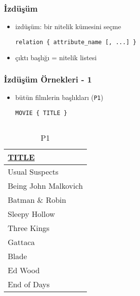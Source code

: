 \documentclass[dvipsnames]{beamer}
\theoremstyle{plain}
\begin{document}
\begin{frame}[fragile]
  \frametitle{İzdüşüm}

  \begin{itemize}
    \item \alert{izdüşüm}: bir nitelik kümesini seçme
    \begin{lstlisting}
relation { attribute_name [, ...] }
    \end{lstlisting}

    \medskip
     \item çıktı başlığı = nitelik listesi
  \end{itemize}
\end{frame}

\begin{frame}[fragile]
  \frametitle{İzdüşüm Örnekleri - 1}

    \begin{itemize}
      \item bütün filmlerin başlıkları (\texttt{P1})
    \begin{lstlisting}
MOVIE { TITLE }
    \end{lstlisting}
    \end {itemize}

    \vspace{-10pt}
    \begin{columns}[b]
      \begin{tiny}
      \begin{table}
        \caption{P1}
        \begin{tabular}{|l|}\hline
\underline{TITLE}             \\[2pt]\hline\hline
Usual Suspects                \\\hline
Being John Malkovich          \\\hline
Batman \& Robin               \\\hline
Sleepy Hollow                 \\\hline
Three Kings                   \\\hline
Gattaca                       \\\hline
Blade                         \\\hline
Ed Wood                       \\\hline
End of Days                   \\\hline
        \end{tabular}
      \end{table}
      \end{tiny}


\end{columns}
\end{frame}
\end{document}
